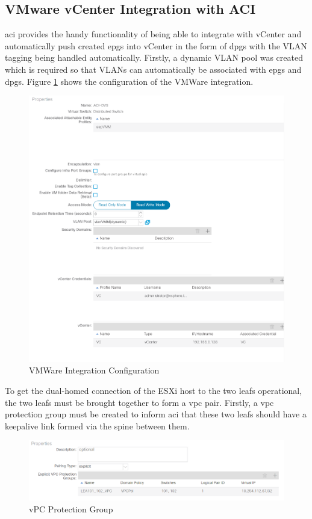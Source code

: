 \subsection{VMware vCenter Integration with ACI}
\gls{aci} provides the handy functionality of being able to integrate with
vCenter and automatically push created \gls{epg}s into vCenter in the form of
\gls{dpg}s with the VLAN tagging being handled automatically.
Firstly, a dynamic VLAN pool was created which is required so that VLANs can
automatically be associated with \gls{epg}s and \gls{dpg}s. Figure
\ref{fig:vmm-integration} shows the configuration of the VMWare integration.

\begin{figure}[H]

    \centering
    \includegraphics[scale=0.6]{images/vmm-integration.png}

    \caption{VMWare Integration Configuration}
    \label{fig:vmm-integration}
\end{figure}

To get the dual-homed connection of the ESXi host to the two leafs operational,
the two leafs must be brought together to form a \gls{vpc} pair.
Firstly, a \gls{vpc} protection group must be created to inform \gls{aci} that
these two leafs should have a keepalive link formed via the spine between them.
\begin{figure}[H]

    \centering
    \includegraphics[scale=0.7]{images/vpc-protection.png}

    \caption{vPC Protection Group}
    \label{fig:vpc-protection}
\end{figure}

